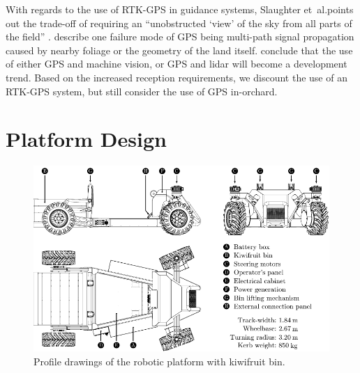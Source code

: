 \documentclass[preprint,authoryear,12pt]{elsarticle}
\begin{document}
        With regards to the use of RTK-GPS in guidance systems, Slaughter et~al.\@ points out the trade-off of requiring an ``unobstructed `view' of the sky from all parts of the field'' \citep{Slaughter2008}.
        \cite{Durrant-Whyte2005} describe one failure mode of GPS being multi-path signal propagation caused by nearby foliage or the geometry of the land itself.
        \cite{Li2009} conclude that the use of either GPS and machine vision, or GPS and lidar will become a development trend.
        Based on the increased reception requirements, we discount the use of an RTK-GPS system, but still consider the use of GPS in-orchard.

\section{Platform Design}
\label{sect:design}

        \begin{figure}[htb]
        \centering
        \includegraphics[width=\linewidth]{imgs/profile_views/AMMP-All-Labelled.pdf}
        \caption{Profile drawings of the robotic platform with kiwifruit bin.}
        \label{fig:AMMP}
        \end{figure}
\end{document}
